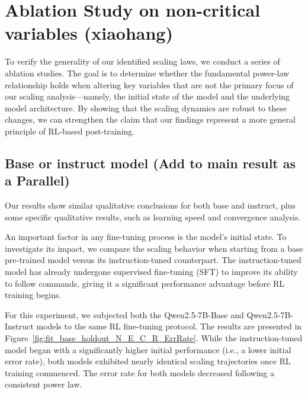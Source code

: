 \section{Ablation Study on non-critical variables  (xiaohang)} 
To verify the generality of our identified scaling laws, we conduct a series of ablation studies. The goal is to determine whether the fundamental power-law relationship holds when altering key variables that are not the primary focus of our scaling analysis---namely, the initial state of the model and the underlying model architecture. By showing that the scaling dynamics are robust to these changes, we can strengthen the claim that our findings represent a more general principle of RL-based post-training.
\subsection{Base or instruct model (Add to main result as a Parallel)} 

\begin{tcolorbox}[colback=blue!5!white, colframe=blue!30!white, title=Observation 1]
Our results show similar qualitative conclusions for both base and instruct, plus some specific qualitative results, such as learning speed and convergence analysis.
\end{tcolorbox}

An important factor in any fine-tuning process is the model's initial state. To investigate its impact, we compare the scaling behavior when starting from a base pre-trained model versus its instruction-tuned counterpart. The instruction-tuned model has already undergone supervised fine-tuning (SFT) to improve its ability to follow commands, giving it a significant performance advantage before RL training begins.

For this experiment, we subjected both the Qwen2.5-7B-Base and Qwen2.5-7B-Instruct models to the same RL fine-tuning protocol. The results are presented in Figure~\ref{fig:fit_base_holdout_N_E_C_R_ErrRate}. While the instruction-tuned model began with a significantly higher initial performance (i.e., a lower initial error rate), both models exhibited nearly identical scaling trajectories once RL training commenced. The error rate for both models decreased following a consistent power law.


